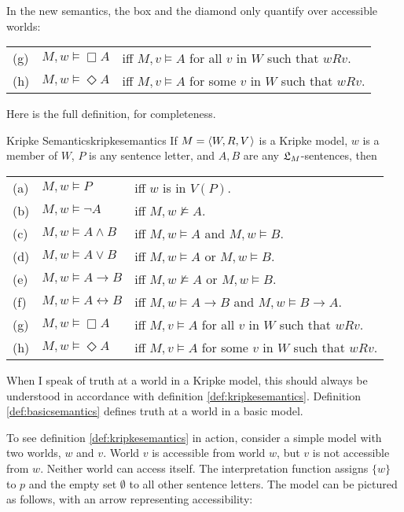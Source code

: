 \noindent%
In the new semantics, the box and the diamond only quantify over
accessible worlds:

\bigskip
\begin{tabular}{lll}
  (g) & $M,w \models \Box A$ &iff $M,v \models A$ for all $v$ in $ W$ such that $wRv$.\\
  (h) & $M,w \models \Diamond A$ &iff $M,v \models A$ for some $v$ in $ W$ such that $wRv$.
\end{tabular}
\bigskip

Here is the full definition, for completeness.

\begin{definition}{Kripke Semantics}{kripkesemantics}
  If $\Mfr = \t{W,R,V}$ is a Kripke model, $w$ is a member of $W$, $P$ is
  any sentence letter, and $A,B$ are any $\mathfrak{L}_M$-sentences, then

  \medskip
  \begin{tabular}{lll}
    (a) & $M,w \models P$ &iff $w$ is in $V(P)$.\\
    (b) & $M,w \models \neg A$ &iff $M,w \not\models A$.\\
    (c) & $M,w \models A \land B$ &iff $M,w \models A$ and $M,w \models B$.\\
    (d) & $M,w \models A \lor B$ &iff $M,w \models A$ or $M,w \models B$.\\
    (e) & $M,w \models A \to B$ &iff $M,w \not\models A$ or $M,w \models B$.\\
    (f) & $M,w \models A \leftrightarrow B$ &iff $M,w \models A\to B$ and $M,w \models B\to A$.\\
    (g) & $M,w \models \Box A$ &iff $M,v \models A$ for all $v$ in $ W$ such that $wRv$.\\
    (h) & $M,w \models \Diamond A$ &iff $M,v \models A$ for some $v$ in $ W$ such that $wRv$.
  \end{tabular}
\end{definition}
%
When I speak of truth at a world in a Kripke model, this should always be
understood in accordance with definition \ref{def:kripkesemantics}. Definition
\ref{def:basicsemantics} defines truth at a world in a basic model.

To see definition \ref{def:kripkesemantics} in action, consider a simple model
with two worlds, $w$ and $v$. World $v$ is accessible from world $w$, but $v$ is
not accessible from $w$. Neither world can access itself. The interpretation
function assigns $\{ w \}$ to $p$ and the empty set $\emptyset$ to all other
sentence letters. The model can be pictured as follows, with an arrow
representing accessibility:

